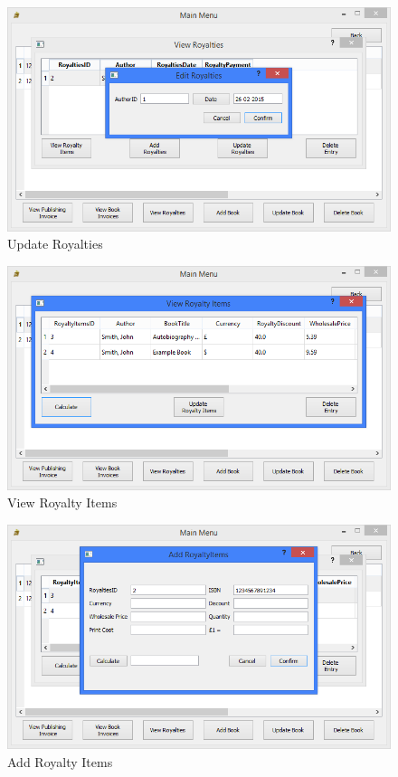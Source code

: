 \begin{figure}[H]
    \caption{Update Royalties} \label{fig:UpdateRoyalties}
    \includegraphics[width=\textwidth]{./Maintenance/UserInterface/UpdateRoyalties.png}
\end{figure}

\begin{figure}[H]
    \caption{View Royalty Items} \label{fig:ViewRoyaltyItems}
    \includegraphics[width=\textwidth]{./Maintenance/UserInterface/ViewRoyaltyItems.png}
\end{figure}

\begin{figure}[H]
    \caption{Add Royalty Items} \label{fig:AddRoyaltyItems}
    \includegraphics[width=\textwidth]{./Maintenance/UserInterface/AddRoyaltyItems.png}
\end{figure}

